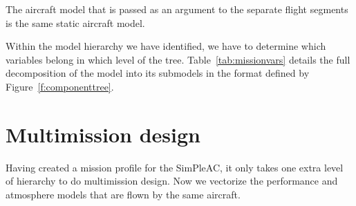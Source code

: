 The aircraft model that is passed as an argument to the separate flight segments is the
same static aircraft model. %

Within the model hierarchy we have identified, we have to determine which variables
belong in which level of the tree. Table~\ref{tab:missionvars} details the full
decomposition of the model into its submodels in the format defined
by Figure~\ref{f:componenttree}.

\begin{center}

    \label{tab:missionvars}
\end{center}

\section{Multimission design}

Having created a mission profile for the SimPleAC, it only takes one extra level of
hierarchy to do multimission design. Now we vectorize the performance
and atmosphere models that are flown by the same aircraft.
